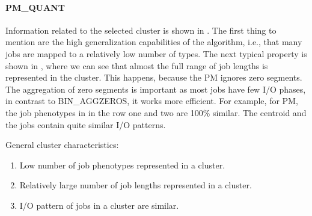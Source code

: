 \documentclass{jhps}
\begin{document}
\paragraph{PM\_QUANT}
Information related to the selected cluster is shown in .
The first thing to mention are the high generalization capabilities of the algorithm, i.e., that many jobs are mapped to a relatively low number of types.
The next typical property is shown in , where we can see that almost the full range of job lengths is represented in the cluster.
This happens, because the PM ignores zero segments.
The aggregation of zero segments is important as most jobs have few I/O phases, in contrast to BIN\_AGGZEROS, it works more efficient.
For example, for PM, the job phenotypes in  in the row one and two are 100$\%$ similar.
The centroid and the jobs contain quite similar I/O patterns.

General cluster characteristics:
\begin{enumerate}
 \item Low number of job phenotypes represented in a cluster.
 \item Relatively large number of job lengths represented in a cluster.
 \item I/O pattern of jobs in a cluster are similar.
\end{enumerate}
\end{document}
